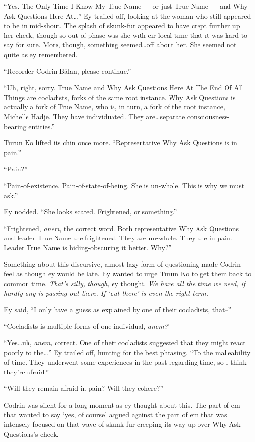 ``Yes. The Only Time I Know My True Name — or just True Name — and Why Ask Questions Here At\ldots{}'' Ey trailed off, looking at the woman who still appeared to be in mid-shout. The splash of skunk-fur appeared to have crept further up her cheek, though so out-of-phase was she with eir local time that it was hard to say for sure. More, though, something seemed\ldots off about her. She seemed not quite as ey remembered.

``Recorder Codrin Bălan, please continue.''

``Uh, right, sorry. True Name and Why Ask Questions Here At The End Of All Things are cocladists, forks of the same root instance. Why Ask Questions is actually a fork of True Name, who is, in turn, a fork of the root instance, Michelle Hadje. They have individuated. They are\ldots separate consciousness-bearing entities.''

Turun Ko lifted its chin once more. ``Representative Why Ask Questions is in pain.''

``Pain?''

``Pain-of-existence. Pain-of-state-of-being. She is un-whole. This is why we must ask.''

Ey nodded. ``She looks scared. Frightened, or something.''

``Frightened, \emph{anem}, the correct word. Both representative Why Ask Questions and leader True Name are frightened. They are un-whole. They are in pain. Leader True Name is hiding-obscuring it better. Why?''

Something about this discursive, almost lazy form of questioning made Codrin feel as though ey would be late. Ey wanted to urge Turun Ko to get them back to common time. \emph{That's silly, though,} ey thought. \emph{We have all the time we need, if hardly any is passing out there. If `out there' is even the right term.}

Ey said, ``I only have a guess as explained by one of their cocladists, that--''

``Cocladists is multiple forms of one individual, \emph{anem?}''

``Yes\ldots uh, \emph{anem,} correct. One of their cocladists suggested that they might react poorly to the\ldots{}'' Ey trailed off, hunting for the best phrasing. ``To the malleability of time. They underwent some experiences in the past regarding time, so I think they're afraid.''

``Will they remain afraid-in-pain? Will they cohere?''

Codrin was silent for a long moment as ey thought about this. The part of em that wanted to say `yes, of course' argued against the part of em that was intensely focused on that wave of skunk fur creeping its way up over Why Ask Questions's cheek.

